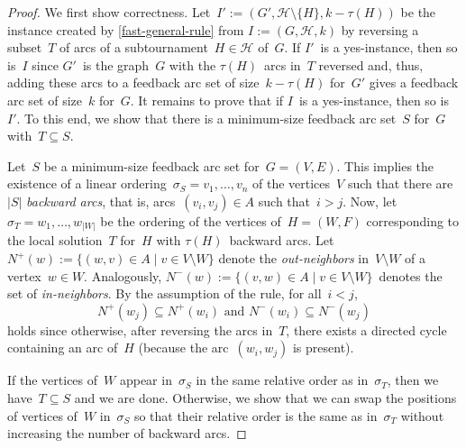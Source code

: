 \documentclass[envcountsame,numbook,smallextended]{svjour3}
\numberwithin{equation}{section}
\numberwithin{figure}{section}
\newcommand{\packing}{\ensuremath{\mathcal H}}
\begin{document}
\begin{proof}
  We first show correctness.
  Let~$I':=(G',\packing\setminus\{H\},k-\tau(H))$ be the instance
  created by \cref{fast-general-rule}
  from \(I:=(G,\packing,k)\)
  by reversing a subset~\(T\) of arcs
  of a subtournament~$H\in\packing$ of~\(G\).
  If \(I'\)~is a yes-instance,
  then so is~\(I\)
  since \(G'\)~is the graph~\(G\)
  with the \(\tau(H)\)~arcs in~\(T\) reversed
  and, thus,
  adding these arcs to a feedback arc set
  of size~\(k-\tau(H)\) for~\(G'\)
  gives a feedback arc set of size~\(k\) for~\(G\).
  It remains to prove that
  if $I$~is a yes-instance,
  then so is~\(I'\).
  To this end, we show that
  there is a minimum-size feedback arc set~$S$
  for~$G$ with~$T\subseteq S$.
  
  Let~$S$ be a minimum-size feedback arc set for~$G=(V,E)$.
  This implies the existence
  of a linear ordering~$\sigma_S = v_1,\ldots,v_n$
  of the vertices~$V$
  such that there are~$|S|$ \emph{backward arcs},
  that is,
  arcs~$(v_i,v_j)\in A$ such that~$i > j$.
  Now, let~$\sigma_T=w_1,\ldots,w_{|W|}$ be the ordering
  of the vertices of~\(H=(W,F)\)
  corresponding to the local solution~$T$ for~$H$
  with $\tau(H)$~backward arcs.
  Let~$N^+(w):=\{(w,v)\in A\mid v\in V\setminus W\}$ denote the \emph{out-neighbors} in~$V\setminus W$ of a vertex~$w\in W$. Analogously,
  $N^-(w):=\{(v,w)\in A\mid v\in V\setminus W\}$~denotes 
  the set of \emph{in-neighbors}.
  By the assumption of the rule, for all~$i < j$,
  \begin{equation}
    N^+(w_j) \subseteq N^+(w_i) \text{ and } N^-(w_i) \subseteq N^-(w_j)
  \end{equation}
  holds since otherwise,
  after reversing the arcs in~$T$,
  there exists a directed cycle containing an arc of~$H$
  (because the arc~$(w_i,w_j)$ is present).
  
  If the vertices of~$W$ appear in~$\sigma_S$ in the same relative order as in~$\sigma_T$, then we have~$T\subseteq S$ and we are done.
  Otherwise, we show that
  we can swap the positions of vertices of~$W$ in~\(\sigma_S\)
  so that their relative order is the same as in~$\sigma_T$
  without increasing the number of backward arcs.



\end{proof}
\end{document}
